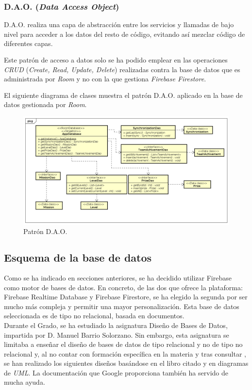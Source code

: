 \documentclass[twoside]{report}
\begin{document}
\subsubsection{D.A.O. (\textit{Data Access Object})}

D.A.O. realiza una capa de abstracción entre los servicios y llamadas de bajo nivel para acceder a los datos del resto de código, evitando así mezclar código de diferentes capas.

Este patrón de acceso a datos solo se ha podido emplear en las operaciones \textit{CRUD} (\textit{Create, Read, Update, Delete}) realizadas contra la base de datos que es administrada por \textit{Room} \cite{roompersistence} y no con la que gestiona \textit{Firebase Firestore}.

El siguiente diagrama de clases muestra el patrón D.A.O. aplicado en la base de datos gestionada por \textit{Room}.

\begin{figure}[H]
\centering
\includegraphics[scale=0.5]{images/roomDao}
\caption{Patrón D.A.O.}
\end{figure}



\subsection{Esquema de la base de datos}
Como se ha indicado en secciones anteriores, se ha decidido utilizar Firebase como motor de bases de datos. En concreto, de las dos que ofrece la plataforma: Firebase Realtime Database y Firebase Firestore, se ha elegido la segunda por ser mucho más compleja y permitir una mayor personalización. Esta base de datos seleccionada es de tipo no relacional, basada en documentos. \\

Durante el Grado, se ha estudiado la asignatura Diseño de Bases de Datos, impartida por D. Manuel Barrio Solorzano. Sin embargo, esta asignatura se limitaba a enseñar el diseño de bases de datos de tipo relacional y no de tipo no relacional y, al no contar con formación específica en la materia y tras consultar \cite{databasedesign}, se han realizado los siguientes diseños basándose en el libro citado y en diagramas de \textit{UML}. La documentación que Google proporciona \cite{fireference} también ha servido de mucha ayuda.
\end{document}
